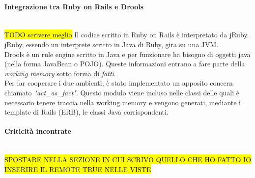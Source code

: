 \paragraph*{Integrazione tra Ruby on Rails e Drools}\mbox{} \\
\hl{TODO scrivere meglio}
Il codice scritto in Ruby on Rails è interpretato da jRuby. jRuby, essendo un interprete scritto in Java di Ruby, gira su una JVM.\\
Drools è un rule engine scritto in Java e per funzionare ha bisogno di oggetti java (nella forma \gls{JavaBean} o \gls{POJO}). Queste informazioni entrano a fare parte della \textit{working memory} sotto forma di \textit{fatti}.\\
Per far cooperare i due ambienti, è stato implementato un apposito  \gls{concern} chiamato \textit{"act\_as\_fact"}. Questo modulo viene incluso nelle classi delle quali è necessario tenere traccia nella working memory e vengono generati, mediante i template di Rails (\gls{ERB}), le classi Java corrispondenti.




\paragraph*{Criticità incontrate}\mbox{} \\
\hl{SPOSTARE NELLA SEZIONE IN CUI SCRIVO QUELLO CHE HO FATTO IO}
\hl{INSERIRE IL REMOTE TRUE NELLE VISTE}




